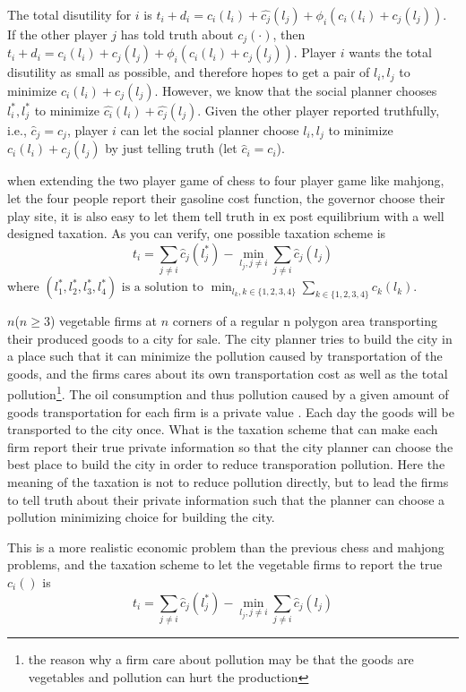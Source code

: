  The total disutility for $i$ is $ t_i+ d_i = c_i(l_i)+\hat{c_j}(l_j)+\phi_i(c_i(l_i)+c_j(l_j))$. If the other player $j$ has told truth about $c_j(\cdot)$, then $ t_i+ d_i = c_i(l_i)+c_j(l_j)+\phi_i(c_i(l_i)+c_j(l_j))$.  Player $i$ wants the total disutility as small as possible, and therefore hopes to get a pair of $l_i,l_j$ to minimize $c_i(l_i)+c_j(l_j)$. However, we know that the social planner chooses $l_i^*,l_j^*$ to minimize $\hat{c_i}(l_i)+\hat{c_j}(l_j)$. Given the other player reported truthfully, i.e.,  $\hat{c}_j=c_j$, player $i$ can let the social planner choose $l_i,l_j$ to minimize $c_i(l_i)+c_j(l_j)$ by just telling truth (let $\hat{c}_i=c_i$).

when extending the two player game of chess to four player game like mahjong, let the four people report their gasoline cost function, the governor choose their play site,
it is also easy to let them tell truth in ex post equilibrium with a well designed taxation. As you can verify, one possible taxation scheme is
$$t_i= \sum_{j\not=i}\hat{c}_j(l_j^*)- \min_{l_j,j\not =i}\sum_{j\not=i}\hat{c}_j(l_j)$$
where $(l_1^*,l_2^*,l_3^*,l_4^*) \text{ is a solution to } \min_{l_k,k\in \{1,2,3,4\}}\sum_{k\in \{1,2,3,4\}}c_k(l_k)$.

\begin{example}
 $n$($n \geq 3$) vegetable firms at $n$ corners of a regular n polygon area transporting their produced goods to a city for sale.
The city planner tries to build the city in a place such that it can minimize the pollution caused by transportation of the goods, 
and the firms cares about its own transportation cost as well as the total pollution\footnote{the reason why a firm care about pollution
may be that the goods are vegetables and pollution can hurt the production}. The oil consumption and thus pollution caused 
by a given amount of goods transportation for each firm is a private value . Each day the goods will be transported to the city once.
What is the taxation scheme that can make each firm report their true private information so that the city 
planner can choose the best place to build the city in order to reduce transporation pollution. Here the meaning of the taxation is not
to reduce pollution directly, but to lead the firms to tell truth about their private information such that the planner can choose a
pollution minimizing choice for building the city.
\end{example}

This is a more realistic economic problem than the previous chess and mahjong problems, and the taxation scheme to let the vegetable firms to report
the true $c_i()$ is
$$ t_i = \sum_{j\not=i}\hat{c}_j(l_j^*)- \min_{l_j,j\not =i}\sum_{j\not=i}\hat{c}_j(l_j) $$

